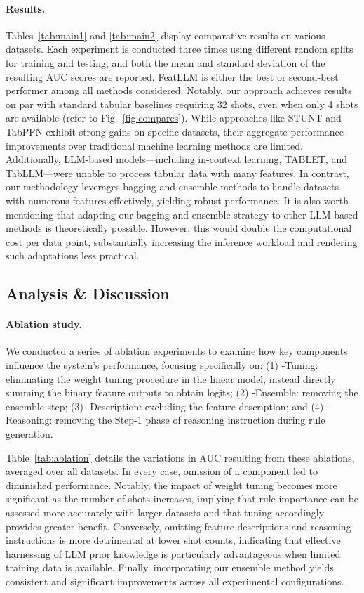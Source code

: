 \vspace*{-0.12in}
\paragraph{Results.}
Tables~\ref{tab:main1} and \ref{tab:main2} display comparative results on various datasets. Each experiment is conducted three times using different random splits for training and testing, and both the mean and standard deviation of the resulting AUC scores are reported. \textsf{FeatLLM} is either the best or second-best performer among all methods considered. Notably, our approach achieves results on par with standard tabular baselines requiring 32 shots, even when only 4 shots are available (refer to Fig.~\ref{fig:compares}). While approaches like STUNT and TabPFN exhibit strong gains on specific datasets, their aggregate performance improvements over traditional machine learning methods are limited. Additionally, LLM-based models—including in-context learning, TABLET, and TabLLM—were unable to process tabular data with many features. In contrast, our methodology leverages bagging and ensemble methods to handle datasets with numerous features effectively, yielding robust performance. It is also worth mentioning that adapting our bagging and ensemble strategy to other LLM-based methods is theoretically possible. However, this would double the computational cost per data point, substantially increasing the inference workload and rendering such adaptations less practical. 

\subsection{Analysis \& Discussion}
\label{sec:analysis}
\paragraph{Ablation study.} We conducted a series of ablation experiments to examine how key components influence the system's performance, focusing specifically on: (1) \textsf{-Tuning}: eliminating the weight tuning procedure in the linear model, instead directly summing the binary feature outputs to obtain logits; (2) \textsf{-Ensemble}: removing the ensemble step; (3) \textsf{-Description}: excluding the feature description; and (4) \textsf{-Reasoning}: removing the Step-1 phase of reasoning instruction during rule generation.

Table~\ref{tab:ablation} details the variations in AUC resulting from these ablations, averaged over all datasets. In every case, omission of a component led to diminished performance. Notably, the impact of weight tuning becomes more significant as the number of shots increases, implying that rule importance can be assessed more accurately with larger datasets and that tuning accordingly provides greater benefit. Conversely, omitting feature descriptions and reasoning instructions is more detrimental at lower shot counts, indicating that effective harnessing of LLM prior knowledge is particularly advantageous when limited training data is available. Finally, incorporating our ensemble method yields consistent and significant improvements across all experimental configurations.

